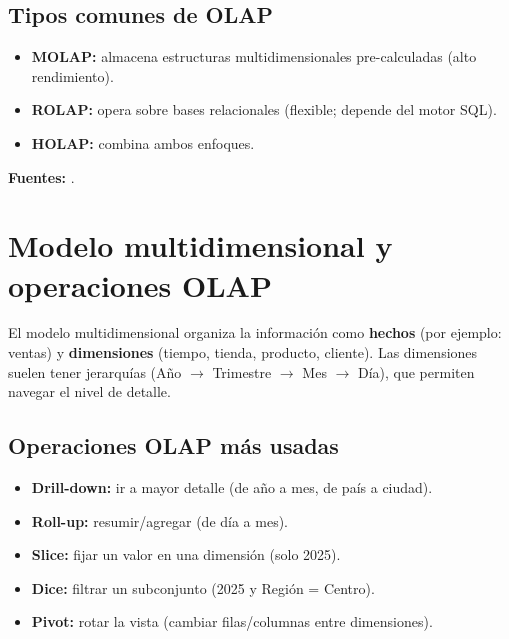 \documentclass[12pt]{article}
\begin{document}
\subsection*{Tipos comunes de OLAP}
\begin{itemize}[leftmargin=*, itemsep=0.25em]
  \item \textbf{MOLAP:} almacena estructuras multidimensionales pre-calculadas (alto rendimiento).
  \item \textbf{ROLAP:} opera sobre bases relacionales (flexible; depende del motor SQL).
  \item \textbf{HOLAP:} combina ambos enfoques.
\end{itemize}

\noindent\textbf{Fuentes:} \cite{ibm_olap, gartner_bi_platforms, kimball_dwtoolkit}.

\section{Modelo multidimensional y operaciones OLAP}
El modelo multidimensional organiza la información como \textbf{hechos} (por ejemplo: ventas) y \textbf{dimensiones} (tiempo, tienda, producto, cliente). Las dimensiones suelen tener jerarquías (Año $\rightarrow$ Trimestre $\rightarrow$ Mes $\rightarrow$ Día), que permiten navegar el nivel de detalle.

\subsection*{Operaciones OLAP más usadas}
\begin{itemize}[leftmargin=*, itemsep=0.25em]
  \item \textbf{Drill-down:} ir a mayor detalle (de año a mes, de país a ciudad).
  \item \textbf{Roll-up:} resumir/agregar (de día a mes).
  \item \textbf{Slice:} fijar un valor en una dimensión (solo 2025).
  \item \textbf{Dice:} filtrar un subconjunto (2025 y Región = Centro).
  \item \textbf{Pivot:} rotar la vista (cambiar filas/columnas entre dimensiones).
\end{itemize}
\end{document}
